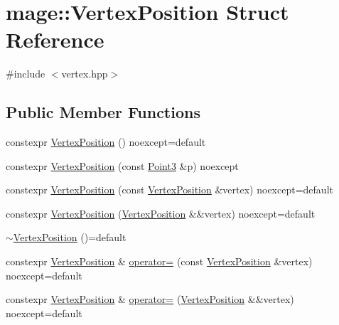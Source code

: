 \hypertarget{structmage_1_1_vertex_position}{}\section{mage\+:\+:Vertex\+Position Struct Reference}
\label{structmage_1_1_vertex_position}


{\ttfamily \#include $<$vertex.\+hpp$>$}

\subsection*{Public Member Functions}
\begin{DoxyCompactItemize}
\item 
constexpr \hyperlink{structmage_1_1_vertex_position_a3d6367a3f555b5003e33132dfd77c1f0}{Vertex\+Position} () noexcept=default
\item 
constexpr \hyperlink{structmage_1_1_vertex_position_abee8a097ada3b0cbdec6c559f2393b0a}{Vertex\+Position} (const \hyperlink{structmage_1_1_point3}{Point3} \&p) noexcept
\item 
constexpr \hyperlink{structmage_1_1_vertex_position_a4f050c756f48e216f1bf540c8ec252aa}{Vertex\+Position} (const \hyperlink{structmage_1_1_vertex_position}{Vertex\+Position} \&vertex) noexcept=default
\item 
constexpr \hyperlink{structmage_1_1_vertex_position_a0198bb4e4d5ec39224a6e9b9dbf52ac0}{Vertex\+Position} (\hyperlink{structmage_1_1_vertex_position}{Vertex\+Position} \&\&vertex) noexcept=default
\item 
\hyperlink{structmage_1_1_vertex_position_ae78ac5fd76f3217ec72435beaa34ed6e}{$\sim$\+Vertex\+Position} ()=default
\item 
constexpr \hyperlink{structmage_1_1_vertex_position}{Vertex\+Position} \& \hyperlink{structmage_1_1_vertex_position_a1d4d4c85a0aaae40a7d7d50f9873f6ef}{operator=} (const \hyperlink{structmage_1_1_vertex_position}{Vertex\+Position} \&vertex) noexcept=default
\item 
constexpr \hyperlink{structmage_1_1_vertex_position}{Vertex\+Position} \& \hyperlink{structmage_1_1_vertex_position_af0ff6c62f29e2170e93fb50cfe713c3a}{operator=} (\hyperlink{structmage_1_1_vertex_position}{Vertex\+Position} \&\&vertex) noexcept=default
\end{DoxyCompactItemize}
